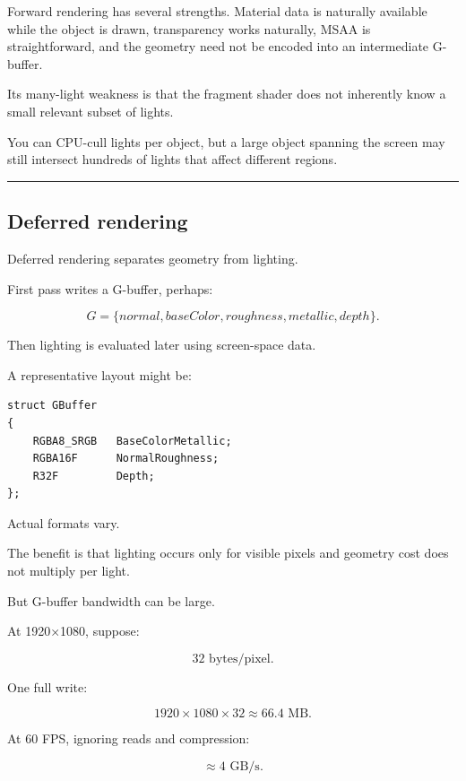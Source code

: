 Forward rendering has several strengths. Material data is naturally available while the object is drawn, transparency works naturally, MSAA is straightforward, and the geometry need not be encoded into an intermediate G-buffer.

Its many-light weakness is that the fragment shader does not inherently know a small relevant subset of lights.

You can CPU-cull lights per object, but a large object spanning the screen may still intersect hundreds of lights that affect different regions.

\begin{center}\rule{0.5\linewidth}{0.5pt}\end{center}

\subsection{Deferred rendering}\label{04-visual-computing-ii-ch040-deferred-rendering}

\hypertarget{04-visual-computing-ii-ch040-deferred-rendering}{}

Deferred rendering separates geometry from lighting.

First pass writes a G-buffer, perhaps:

\[
G=
\{
normal,
baseColor,
roughness,
metallic,
depth
\}.
\]

Then lighting is evaluated later using screen-space data.

A representative layout might be:

\begin{verbatim}
struct GBuffer
{
    RGBA8_SRGB   BaseColorMetallic;
    RGBA16F      NormalRoughness;
    R32F         Depth;
};
\end{verbatim}

Actual formats vary.

The benefit is that lighting occurs only for visible pixels and geometry cost does not multiply per light.

But G-buffer bandwidth can be large.

At 1920×1080, suppose:

\[
32\text{ bytes/pixel}.
\]

One full write:

\[
1920\times1080\times32
\approx66.4\text{ MB}.
\]

At 60 FPS, ignoring reads and compression:

\[
\approx4\text{ GB/s}.
\]

